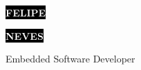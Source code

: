 \documentclass[9pt]{developercv} %
\begin{document}

\begin{minipage}[t]{0.45\textwidth} %
	\vspace{-\baselineskip} %
	
	\colorbox{black}{{\HUGE\textcolor{white}{\textbf{\MakeUppercase{Felipe}}}}} %
	
	\colorbox{black}{{\HUGE\textcolor{white}{\textbf{\MakeUppercase{Neves}}}}} %
	
	\vspace{6pt}
	
	{\huge Embedded Software Developer} %
\end{minipage}
\begin{minipage}[t]{0.275\textwidth} %
	\vspace{-\baselineskip} %
	
\end{minipage}
\begin{minipage}[t]{0.275\textwidth} %
	\vspace{-\baselineskip} %
	
	\\
	\\
	\\	
\end{minipage}
\end{document}
